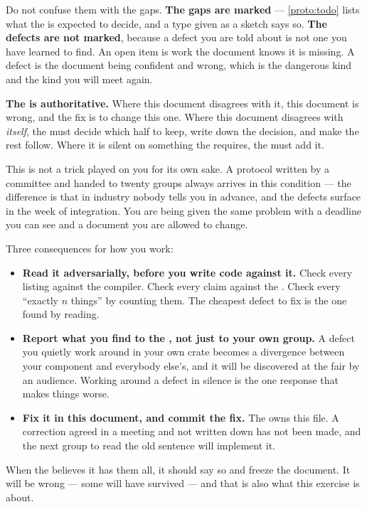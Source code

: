 \documentclass{article}
\begin{document}
Do not confuse them with the gaps. \textbf{The gaps are marked} --- \cref{proto:todo} lists what
the \WG{} is expected to decide, and a type given as a sketch says so. \textbf{The defects are
not marked}, because a defect you are told about is not one you have learned to find. An open
item is work the document knows it is missing. A defect is the document being confident and
wrong, which is the dangerous kind and the kind you will meet again.

\textbf{The \MD{} is authoritative.} Where this document disagrees with it, this document is
wrong, and the fix is to change this one. Where this document disagrees with \emph{itself}, the
\WG{} must decide which half to keep, write down the decision, and make the rest follow. Where it
is silent on something the \MD{} requires, the \WG{} must add it.

This is not a trick played on you for its own sake. A protocol written by a committee and handed to
twenty groups always arrives in this condition --- the difference is that in industry nobody tells
you in advance, and the defects surface in the week of integration. You are being given the same
problem with a deadline you can see and a document you are allowed to change.

Three consequences for how you work:

\begin{itemize}
    \item \textbf{Read it adversarially, before you write code against it.} Check every listing
      against the compiler. Check every claim against the \MD. Check every ``exactly $n$ things''
      by counting them. The cheapest defect to fix is the one found by reading.
    \item \textbf{Report what you find to the \WG, not just to your own group.} A defect you
      quietly work around in your own crate becomes a divergence between your component and
      everybody else's, and it will be discovered at the fair by an audience. Working around a
      defect in silence is the one response that makes things worse.
    \item \textbf{Fix it in this document, and commit the fix.} The \WG{} owns this file. A
      correction agreed in a meeting and not written down has not been made, and the next group to
      read the old sentence will implement it.
\end{itemize}

When the \WG{} believes it has them all, it should say so and freeze the document. It will be
wrong --- some will have survived --- and that is also what this exercise is about.
\end{document}
